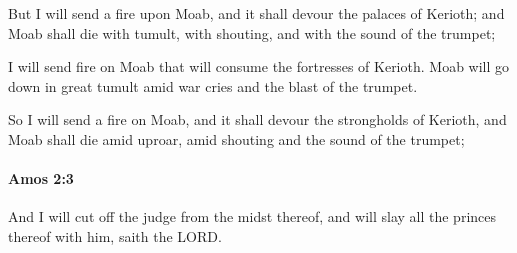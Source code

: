 			\begin{versebox}
					\item[BHS] 
					\item[LXX] 
					\item[ASV] But I will send a fire upon Moab, and it shall devour the palaces of Kerioth; and Moab shall die with tumult, with shouting, and with the sound of the trumpet;
					\item[NIV] I will send fire on Moab that will consume the fortresses of Kerioth. Moab will go down in great tumult amid war cries and the blast of the trumpet.
					\item[NRSV] So I will send a fire on Moab, and it shall devour the strongholds of Kerioth, and Moab shall die amid uproar, amid shouting and the sound of the trumpet;
			\end{versebox}

		\paragraph{Amos 2:3} %
			\label{AMOS-2-3}

			And I will cut off the judge from the midst thereof, and will slay all the princes thereof with him, saith the LORD.

